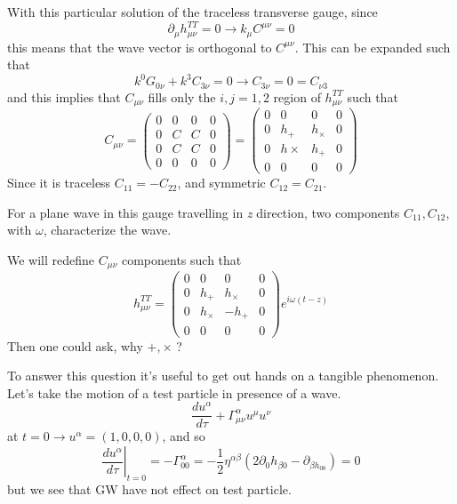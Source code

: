 With this particular solution of the traceless transverse gauge, since 
\[
\partial_{\mu }h^{TT}_{\mu \nu } = 0 \to k_{\mu }C^{\mu \nu } = 0
\]
this means that the wave vector is orthogonal to $C^{\mu \nu }$. This can be expanded such that 
\[
k^{0}G_{0\nu } + k^{3}C_{3\nu } = 0 \to  C_{3\nu } = 0 = C_{\nu  3}
\]
and this implies that $C_{\mu \nu }$ fills only the $i,j = 1,2$ region of $h^{TT}_{\mu \nu }$ such that
\[
C_{\mu \nu } = \begin{pmatrix}
0 & 0 & 0 & 0 \\
0 & C & C & 0 \\
0 & C & C & 0 \\
0 & 0 & 0 & 0
\end{pmatrix} = \begin{pmatrix}
0 & 0 & 0 & 0 \\
0 & h_{+} & h_{\times} & 0 \\
0 & h{\times} & h_{+} & 0 \\
0 & 0 & 0 & 0
\end{pmatrix} 
\]
Since it is traceless $C_{11} = -C_{22}$, and symmetric $C_{12} = C_{21}$.\par
For a plane wave in this gauge travelling in \emph{z} direction, two components $C_{11}, C_{12}$, with $\omega $, characterize the wave.

We will redefine $C_{\mu \nu }$ components such that
\[
h_{\mu \nu  }^{TT}= \begin{pmatrix}
0 & 0 & 0 & 0 \\
0 & h_{+} & h_{\times} & 0 \\
0 & h_{\times} & -h_{+} & 0 \\
0 & 0 & 0 & 0
\end{pmatrix} e^{i \omega \left( t-z \right)}
\]
Then one could ask, why $+, \times$ ? \par
To answer this question it's useful to get out hands on a tangible phenomenon. Let's take the motion of a test particle in presence of a wave. 
\[
\frac{d u^{\alpha }}{d \tau } + \Gamma ^{\alpha }_{\mu \nu }u^{\mu }u^{\nu }
\]
at $t=0 \to u^{\alpha }= \left( 1,0,0,0 \right)$, and so
\[
 \left.\frac{d u^{\alpha }}{d \tau }\right|_{t=0} = - \Gamma ^{\alpha }_{00} = -\frac{1}{2}\eta ^{\alpha \beta }\left( 2\partial_{0}h_{\beta 0}-\partial_{\beta h_{00}} \right) =0
\]
but we see that GW have not effect on test particle.\par

